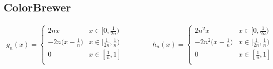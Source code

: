 \documentclass{article}
\theoremstyle{definition}
\theoremstyle{definition}
\theoremstyle{remark}
\begin{document}
\subsection*{ColorBrewer}

\begin{align*}
    g_n(x)=\begin{cases}
        2nx&x\in[0,\frac{1}{2n})\\
        -2n\bigl(x-\frac{1}{n}\bigr)&x\in[\frac{1}{2n},\frac{1}{n})\\
        0&x\in[\frac{1}{n},1]\\
    \end{cases}\qquad\qquad
    h_n(x)=\begin{cases}
        2n^2x&x\in[0,\frac{1}{2n})\\
        -2n^2\bigl(x-\frac{1}{n}\bigr)&x\in[\frac{1}{2n},\frac{1}{n})\\
        0&x\in[\frac{1}{n},1]\\
    \end{cases}
\end{align*}
\end{document}
